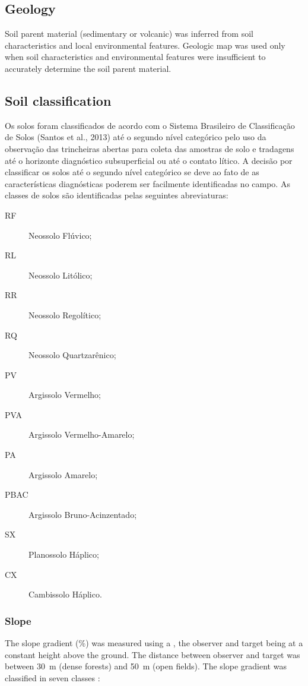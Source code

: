 \tocless\subsection{Geology}

Soil parent material (sedimentary or volcanic) was inferred from soil characteristics and local environmental 
features. Geologic map \cite{MacielFilho1990} was used only when soil characteristics and environmental features 
were insufficient to accurately determine the soil parent material.

\tocless\subsection{Soil classification}

Os solos foram classificados de acordo com o Sistema Brasileiro de Classificação de Solos (Santos et al., 2013) até o segundo nível categórico pelo uso da observação das trincheiras abertas para coleta das amostras de solo e tradagens até o horizonte diagnóstico subsuperficial ou até o contato lítico. A decisão por classificar os solos até o segundo nível categórico se deve ao fato de as características diagnósticas poderem ser facilmente identificadas no campo. As classes de solos são identificadas pelas seguintes abreviaturas: 

\begin{description}
\item [RF] Neossolo Flúvico;
\item [RL] Neossolo Litólico;
\item [RR] Neossolo Regolítico;
\item [RQ] Neossolo Quartzarênico;
\item [PV] Argissolo Vermelho;
\item [PVA] Argissolo Vermelho-Amarelo;
\item [PA] Argissolo Amarelo;
\item [PBAC] Argissolo Bruno-Acinzentado;
\item [SX] Planossolo Háplico;
\item [CX] Cambissolo Háplico.
\end{description}

\subsubsection{Slope}

The slope gradient (\%) was measured using a \clinometer, the observer
and target being at a constant height above the ground. The distance 
between observer and target was between 30~m (dense forests) and 50~m
(open fields). The slope gradient was classified in seven classes
\cite{SantosEtAl2005, SantosEtAl2013}:

